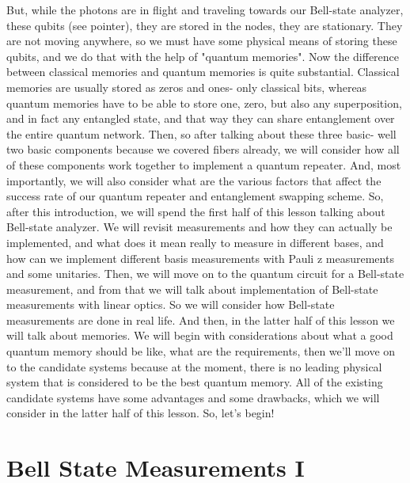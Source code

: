 But, while the photons are in flight and traveling towards our Bell-state analyzer, these qubits (see pointer), they are stored in the nodes, they are stationary. They are not moving anywhere, so we must have some physical means of storing these qubits, and we do that with the help of "quantum memories". Now the difference between classical memories and quantum memories is quite substantial. Classical memories are usually stored as zeros and ones- only classical bits, whereas quantum memories have to be able to store one, zero, but also any superposition, and in fact any entangled state, and that way they can share entanglement over the entire quantum network. Then, so after talking about these three basic- well two basic components because we covered fibers already, we will consider how all of these components work together to implement a quantum repeater. And, most importantly, we will also consider what are the various factors that affect the success rate of our quantum repeater and entanglement swapping scheme. So, after this introduction, we will spend the first half of this lesson talking about Bell-state analyzer. We will revisit measurements and how they can actually be implemented, and what does it mean really to measure in different bases, and how can we implement different basis measurements with Pauli z measurements and some unitaries. Then, we will move on to the quantum circuit for a Bell-state measurement, and from that we will talk about implementation of Bell-state measurements with linear optics. So we will consider how Bell-state measurements are done in real life. And then, in the latter half of this lesson we will talk about memories. We will begin with considerations about what a good quantum memory should be like, what are the requirements, then we'll move on to the candidate systems because at the moment, there is no leading physical system that is considered to be the best quantum memory. All of the existing candidate systems have some advantages and some drawbacks, which we will consider in the latter half of this lesson. So, let's begin!



\section{Bell State Measurements I}

